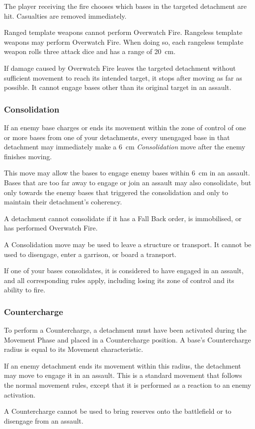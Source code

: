 The player receiving the fire chooses which bases in the targeted detachment are hit. Casualties are removed immediately.

Ranged template weapons cannot perform Overwatch Fire. Rangeless template weapons may perform Overwatch Fire. When doing so, each rangeless template weapon rolls three attack dice and has a range of 20~cm.

If damage caused by Overwatch Fire leaves the targeted detachment without sufficient movement to reach its intended target, it stops after moving as far as possible. It cannot engage bases other than its original target in an assault.

\subsubsection{Consolidation}

If an enemy base charges or ends its movement within the zone of control of one or more bases from one of your detachments, every unengaged base in that detachment may immediately make a 6~cm \textit{Consolidation} move after the enemy finishes moving.

This move may allow the bases to engage enemy bases within 6~cm in an assault. Bases that are too far away to engage or join an assault may also consolidate, but only towards the enemy bases that triggered the consolidation and only to maintain their detachment's coherency.

A detachment cannot consolidate if it has a Fall Back order, is immobilised, or has performed Overwatch Fire.

A Consolidation move may be used to leave a structure or transport. It cannot be used to disengage, enter a garrison, or board a transport.

If one of your bases consolidates, it is considered to have engaged in an assault, and all corresponding rules apply, including losing its zone of control and its ability to fire.

\subsubsection{Countercharge}

To perform a Countercharge, a detachment must have been activated during the Movement Phase and placed in a Countercharge position. A base's Countercharge radius is equal to its Movement characteristic.

If an enemy detachment ends its movement within this radius, the detachment may move to engage it in an assault. This is a standard movement that follows the normal movement rules, except that it is performed as a reaction to an enemy activation.

A Countercharge cannot be used to bring reserves onto the battlefield or to disengage from an assault.